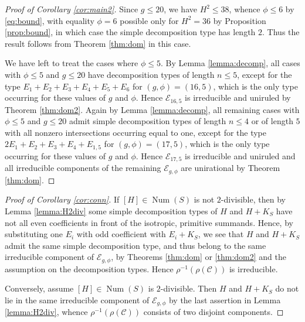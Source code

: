 \documentclass[11pt]{amsart}
\theoremstyle{definition}
\def\E{{\mathcal E}}
\def\C{{\mathcal C}}
\def\Num{\operatorname{Num}}
\begin{document}
\begin{proof}[Proof of Corollary \ref{cor:main2}]
  Since $g \leqslant 20$, we have $H^2 \leqslant 38$, whence $\phi \leqslant 6$ by \eqref{eq:bound}, with equality $\phi=6$ possible only for $H^2=36$  by Proposition \ref{prop:bound}, in which case the simple decomposition type has  length $2$.    Thus the result follows from Theorem \ref{thm:dom} in this case. 

We have left to treat the cases where $\phi \leqslant 5$. By Lemma \ref{lemma:decomp}, all cases with $\phi \leqslant 5$ and $g \leqslant 20$ have decomposition types of length $n\leqslant 5$, except for the type $E_1+E_{2}+E_{3}+E_4+E_5+E_6$ for $(g,\phi)=(16,5)$, which is the only type occurring for these values of $g$ and $\phi$. Hence $\E_{16,5}$ is irreducible and uniruled by Theorem \ref{thm:dom2}. Again by Lemma \ref{lemma:decomp}, all remaining cases with $\phi \leqslant 5$ and $g \leqslant 20$  admit  simple decomposition types of length $n\leqslant 4$ or of length $5$ with all nonzero intersections occurring equal to one, except for the type $2E_1+E_2+E_3+E_4+E_{1,5}$ for $(g,\phi)=(17,5)$, which is the only type occurring for these values of $g$ and $\phi$. Hence $\E_{17,5}$ is irreducible and uniruled 
and all  irreducible  components of the remaining $\E_{g,\phi}$ are unirational 
by Theorem \ref{thm:dom}.
 \end{proof}







\begin{proof}[Proof of Corollary \ref{cor:conn}]
  If $[H] \in \Num(S)$ is  not $2$-divisible, then  by Lemma \ref{lemma:H2div} 
some simple decomposition types of $H$ and $H+K_S$ have not all even coefficients in front of the isotropic, primitive summands. Hence, by substituting one $E_i$ with odd coefficient with $E_i+K_S$, we see that $H$ and $H+K_S$  admit the same  simple decomposition type, and thus belong to the same  irreducible  component of $\E_{g,\phi}$, by Theorems \ref{thm:dom} or \ref{thm:dom2}  
and the  assumption on the decomposition types. Hence $\rho^{-1}(\rho(\C))$ is irreducible.

Conversely, assume $[H] \in \Num(S)$ is  $2$-divisible.  Then $H$ and $H+K_S$  do not  lie in the same  irreducible  component of $\E_{g,\phi}$  by  
the last assertion in Lemma 
\ref{lemma:H2div},  whence $\rho^{-1}(\rho(\C))$ consists of two disjoint components.  \end{proof}
\end{document}
